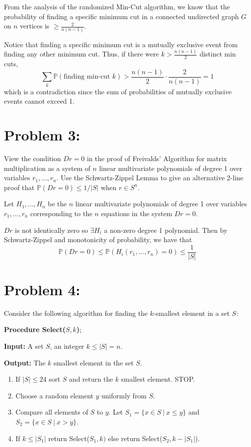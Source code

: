 \documentclass[12pt,letterpaper]{article}
\newcommand{\abs}[1]{\left\vert #1 \right\vert}
\renewcommand{\P}{\mathbb{P}}
\begin{document}
\color{darkblue}
   From the analysis of the randomized Min-Cut algorithm, we know that the probability of finding a specific minimum cut in a connected undirected graph $G$ on $n$ vertices is  $\geq \frac{2}{n(n-1)}$.

   Notice that finding a specific minimum cut is a mutually exclusive event from finding any other minimum cut. Thus, if there were $k > \frac{n(n-1)}{2}$ distinct min cuts, 
   \[\sum_k \P(\text{finding min-cut } k) > \frac{n(n-1)}{2} \cdot \frac{2}{n(n-1)} = 1\]
   which is a contradiction since the sum of probabilities of mutually exclusive events cannot exceed 1. 

    
\color{black}


\section*{Problem 3:}
View the condition $Dr = 0$ in the proof of Freivalds' Algorithm for matrix multiplication as a system of $n$ linear multivariate polynomials of degree 1 over variables $r_1, \dots, r_n$. Use the Schwartz-Zippel Lemma to give an alternative 2-line proof that $\mathbb{P}(Dr = 0) \le 1/\vert{}S\vert{}$ when $r \in S^n$.

\color{darkblue}
    Let $H_1, \dots, H_n$ be the $n$ linear multivariate polynomials of degree 1 over variables $r_1, \dots, r_n$ corresponding to the $n$ equations in the system $Dr = 0$.

    $Dr$ is not identically zero so $\exists H_i$ a non-zero degree 1 polynomial. Then by Schwartz-Zippel and monotonicity of probability, we have that
    \[\P(Dr = 0) \leq \P(H_i(r_1, \dots, r_n) = 0) \leq \frac{1}{\abs S}\]
\color{black}

\section*{Problem 4:}
Consider the following algorithm for 
finding the $k$-smallest element in a set $S$:
\begin{tcolorbox}[standard jigsaw,
	opacityback=0,
	breakable
	]
{\bf Procedure Select($S,k$)};

{\bf Input:} A set $S$, an integer $k\leq |S|=n$.

{\bf Output:} The $k$ smallest element in the set $S$.

\begin{enumerate}
\item If $|S|\leq 24$ sort $S$ and return the $k$ smallest element. STOP.
\item
Choose a random element $y$ uniformly from $S$.
\item
Compare all elements of $S$ to $y$. Let 
$S_1= \{x\in S ~|~ x\leq y\}$ and 
$S_2 =\{x\in S ~|~ x> y\}.$
\item
If $k\leq |S_1|$ return Select($S_1,k)$ else return Select($S_2,k-|S_1|$).
\end{enumerate}
\end{tcolorbox}
\end{document}
